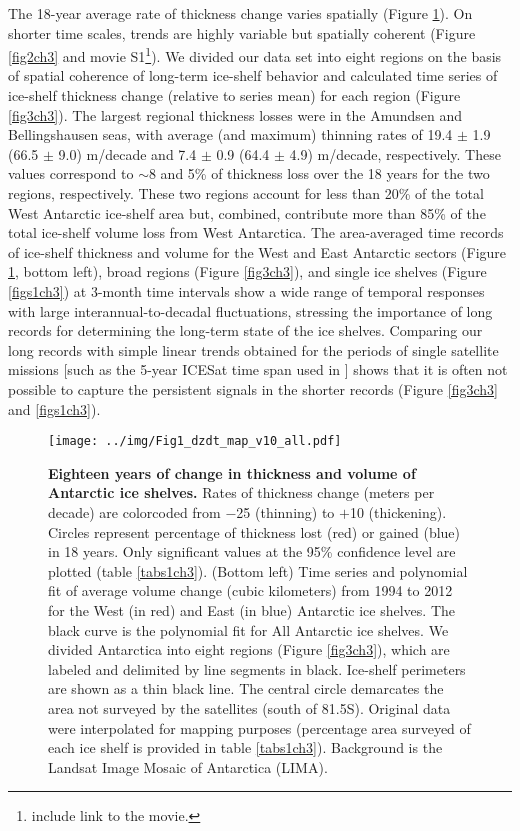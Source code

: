 The 18-year average rate of thickness change varies spatially (Figure \ref{fig1ch3}).
On shorter time scales, trends are highly variable but spatially coherent
(Figure \ref{fig2ch3} and movie S1\footnote{include link to the movie.}). We divided
our data set into eight regions on the basis of spatial coherence of long-term
ice-shelf behavior and calculated time series of ice-shelf thickness change
(relative to series mean) for each region (Figure \ref{fig3ch3}). The largest regional
thickness losses were in the Amundsen and Bellingshausen seas, with average
(and maximum) thinning rates of 19.4 $\pm$ 1.9 (66.5 $\pm$ 9.0) m/decade and
7.4 $\pm$ 0.9 (64.4 $\pm$ 4.9) m/decade, respectively. These values correspond
to $\sim$8 and 5\% of thickness loss over the 18 years for the two regions,
respectively. These two regions account for less than 20\% of the total West
Antarctic ice-shelf area but, combined, contribute more than 85\% of the total
ice-shelf volume loss from West Antarctica. The area-averaged time records of
ice-shelf thickness and volume for the West and East Antarctic sectors 
(Figure \ref{fig1ch3}, bottom left), broad regions (Figure \ref{fig3ch3}), and single ice
shelves (Figure \ref{figs1ch3}) at 3-month time intervals show a wide range of
temporal responses with large interannual-to-decadal fluctuations, stressing
the importance of long records for determining the long-term state of the ice
shelves. Comparing our long records with simple linear trends obtained for the
periods of single satellite missions [such as the 5-year ICESat time span used
in \textcite{Pritchard2012}] shows that it is often not possible to capture the
persistent signals in the shorter records (Figure \ref{fig3ch3} and \ref{figs1ch3}).


\begin{figure}[!ht]
  \texttt{[image: ../img/Fig1\_dzdt\_map\_v10\_all.pdf]}
  \caption{{\bf Eighteen years of change in thickness and volume of Antarctic
  ice shelves.} Rates of thickness change (meters per decade) are colorcoded
  from $-$25 (thinning) to $+$10 (thickening). Circles represent percentage of
  thickness lost (red) or gained (blue) in 18 years. Only significant values at
  the 95\% confidence level are plotted (table \ref{tabs1ch3}). (Bottom left)
  Time series and polynomial fit of average volume change (cubic kilometers)
  from 1994 to 2012 for the West (in red) and East (in blue) Antarctic ice
  shelves. The black curve is the polynomial fit for All Antarctic ice shelves.
  We divided Antarctica into eight regions (Figure \ref{fig3ch3}), which are labeled
  and delimited by line segments in black. Ice-shelf perimeters are shown as a
  thin black line. The central circle demarcates the area not surveyed by the
  satellites (south of 81.5\degree S). Original data were interpolated for
  mapping purposes (percentage area surveyed of each ice shelf is provided in
  table \ref{tabs1ch3}). Background is the Landsat Image Mosaic of Antarctica
  (LIMA).}
  \label{fig1ch3}
\end{figure}


